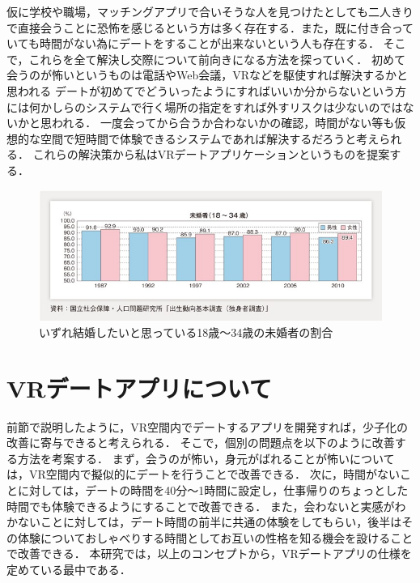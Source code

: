 \documentclass[12pt]{ltjsarticle}
\begin{document}

仮に学校や職場，マッチングアプリで合いそうな人を見つけたとしても二人きりで直接会うことに恐怖を感じるという方は多く存在する\cite{yoshimura2020}．また，既に付き合っていても時間がない為にデートをすることが出来ないという人も存在する．
そこで，これらを全て解決し交際について前向きになる方法を探っていく．
初めて会うのが怖いというものは電話やWeb会議，VRなどを駆使すれば解決するかと思われる
デートが初めてでどういったようにすればいいか分からないという方には何かしらのシステムで行く場所の指定をすれば外すリスクは少ないのではないかと思われる．
一度会ってから合うか合わないかの確認，時間がない等も仮想的な空間で短時間で体験できるシステムであれば解決するだろうと考えられる．
これらの解決策から私はVRデートアプリケーションというものを提案する．
\begin{figure}[h]
\centering
 \includegraphics[width=150mm]{iyoku.jpg}
 \caption{いずれ結婚したいと思っている18歳～34歳の未婚者の割合}
 \label{fig:教科書}
\end{figure}

\section{VRデートアプリについて}
前節で説明したように，VR空間内でデートするアプリを開発すれば，少子化の改善に寄与できると考えられる．
そこで，個別の問題点を以下のように改善する方法を考案する．
まず，会うのが怖い，身元がばれることが怖いについては，VR空間内で擬似的にデートを行うことで改善できる．
次に，時間がないことに対しては，デートの時間を40分〜1時間に設定し，仕事帰りのちょっとした時間でも体験できるようにすることで改善できる．
また，会わないと実感がわかないことに対しては，デート時間の前半に共通の体験をしてもらい，後半はその体験についておしゃべりする時間としてお互いの性格を知る機会を設けることで改善できる．
本研究では，以上のコンセプトから，VRデートアプリの仕様を定めている最中である．
\end{document}
